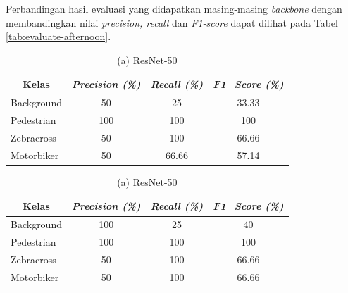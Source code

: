 Perbandingan hasil evaluasi yang didapatkan masing-masing \textit{backbone} dengan membandingkan nilai \textit{precision, recall} dan \textit{F1-score} dapat dilihat pada Tabel \ref{tab:evaluate-afternoon}.

\begin{table}[!h]
	\centering
	\begin{minipage}[b]{\textwidth}
		\centering
		\begin{tabular}{|l|c|c|c|}
			\hline
			\multicolumn{1}{|c|}{\textbf{Kelas}} & \textit{\textbf{Precision (\%)}} & \textit{\textbf{Recall (\%)}} & \textit{\textbf{F1\_Score (\%)}} \\ \hline
			Background                           & 50                               & 25                            & 33.33                            \\ \hline
			Pedestrian                           & 100                              & 100                           & 100                              \\ \hline
			Zebracross                           & 50                               & 100                           & 66.66                            \\ \hline
			Motorbiker                           & 50                               & 66.66                         & 57.14                            \\ \hline
		\end{tabular}
		\caption*{(a) ResNet-50}
	\end{minipage}
	\vfill
	\begin{minipage}[b]{\textwidth}
		\centering
		\begin{tabular}{|l|c|c|c|}
			\hline
			\multicolumn{1}{|c|}{\textbf{Kelas}} & \textit{\textbf{Precision (\%)}} & \textit{\textbf{Recall (\%)}} & \textit{\textbf{F1\_Score (\%)}} \\ \hline
			Background                           & 100                              & 25                            & 40                               \\ \hline
			Pedestrian                           & 100                              & 100                           & 100                              \\ \hline
			Zebracross                           & 50                               & 100                           & 66.66                            \\ \hline
			Motorbiker                           & 50                               & 100                           & 66.66                            \\ \hline

\end{tabular}
\end{minipage}
\end{table}
